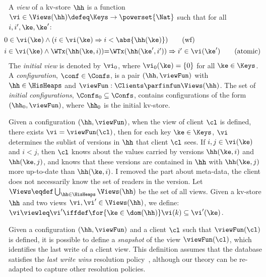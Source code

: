 \begin{definition}[Views]
\label{def:view}
\label{def:cuts}
\label{def:views}
\label{def:configuration}
A \emph{view} of a kv-store $\hh$ is a function
$\vi \in \Views(\hh) \defeq \Keys \to\powerset{\Nat}$ such that for all $i, i', \ke, \ke'$:
\begin{align}
    & \hspace*{-8pt}
    0 \in \vi(\ke) 
    \wedge (i \in \vi(\ke) \Rightarrow i < \abs{ \hh(\ke) }) 
    \tag{wf}
    \label{eq:view.wf}\\
    & \hspace*{-8pt}
    \begin{array}{@{}l@{}}
	i \in \vi(\ke)  
  	\land \WTx(\hh(\ke, i)) {=} \WTx(\hh(\ke', i'))  
  	\Rightarrow i' \in \vi(\ke')
    \end{array}
	\tag{atomic}
	\label{eq:view.atomic}
\end{align}
The \emph{initial view} is denoted by $\vi_{0}$, where $\vi_{0}(\ke) = \{0\}$ for all $\ke \in \Keys$. 
A \emph{configuration}, $\conf \in \Confs$,  is a pair $ (\hh, \viewFun)$
with $\hh \in \HisHeaps$ and
$\viewFun : \Clients \parfinfun \Views(\hh)$. 
The set of \emph{initial configurations}, $\Confs_0 \subseteq \Confs$, contains configurations of the form $ (\hh_0, \viewFun)$, where $\hh_0$ is the initial kv-store. 
\end{definition}
%


Given a configuration $(\hh, \viewFun)$, when the view of client 
$\cl$ is defined, \ie there exists $\vi = \viewFun(\cl)$, then for each key $\ke \in \Keys$, 
$\vi$ determines the sublist of versions in $\hh$ that client $\cl$ sees. 
If $i,j \in \vi(\ke)$ and $i < j$, then $\cl$ knows about the values 
carried by versions $\hh(\ke, i)$ and  $\hh(\ke, j)$, 
and  knows that these versions are contained in $\hh$ with  $\hh(\ke, j)$ more 
up-to-date than $\hh(\ke, i)$. 
\ac{I removed the  part about meta-data, the client does not necessarily know the set of 
readers in the version.}
Let $\Views \eqdef \bigcup_{\hh \in \HisHeaps} \Views(\hh)$ be the set of all views. 
Given a kv-store $\hh$ and two views $\vi, \vi' \in \Views(\hh)$, 
we define: $\vi \viewleq \vi' \iffdef \for{\ke \in \dom(\hh)} \vi(k) \subseteq \vi'(\ke)$.

Given a configuration $(\hh, \viewFun)$ and a client $\cl$ such that $\viewFun(\cl)$ is
defined, it is possible to define a \emph{snapshot} of the
view $\viewFun  (\cl)$, which identifies the last write of a client
view. This definition assumes that the database satisfies the \emph{last write wins}
resolution policy~\cite{framework-concur}, although our theory can be 
re-adapted to capture other resolution policies. 

